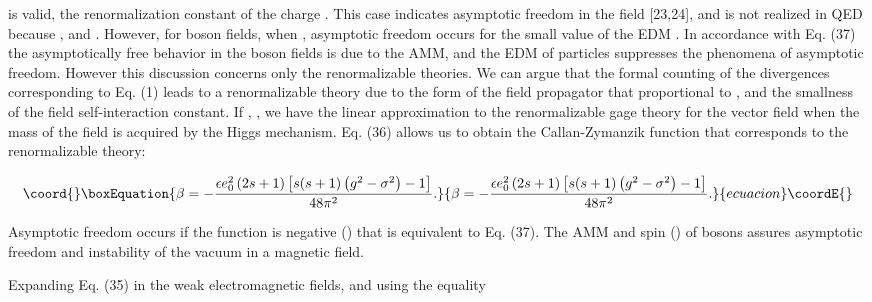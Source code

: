 \documentclass[a4paper,12pt]{article}
\begin{document}
is valid, the renormalization constant of the charge \coordHE{}. This
case indicates asymptotic freedom in the field [23,24], and is not realized
in QED because \coordHE{}, \coordHE{} and \coordHE{}. However, for boson
fields, when \coordHE{}, asymptotic freedom occurs for the small value of
the EDM \myHighlight{$\sigma $}\coordHE{}. In accordance with Eq. (37) the asymptotically free
behavior in the boson fields is due to the AMM, and the EDM of particles
suppresses the phenomena of asymptotic freedom. However this discussion
concerns only the renormalizable theories. We can argue that the formal
counting of the divergences corresponding to Eq. (1) leads to a
renormalizable theory due to the form of the field propagator that
proportional to \coordHE{}, and the smallness of the field self-interaction
constant. If \coordHE{}, \coordHE{}, we have the linear approximation to the
renormalizable gage theory for the vector field when the mass of the field
is acquired by the Higgs mechanism. Eq. (36) allows us to obtain the
Callan-Zymanzik \myHighlight{$\beta $}\coordHE{} function that corresponds to the renormalizable
theory:

\begin{equation}\coord{}\boxEquation{
\beta =-\frac{\epsilon e_0^2\left( 2s+1\right) \left[ s(s+1)\left(
g^2-\sigma ^2\right) -1\right] }{48\pi ^2}.  \label{38}
}{
\beta =-\frac{\epsilon e_0^2\left( 2s+1\right) \left[ s(s+1)\left(
g^2-\sigma ^2\right) -1\right] }{48\pi ^2}.  }{ecuacion}\coordE{}\end{equation}

Asymptotic freedom occurs if the \myHighlight{$\beta $}\coordHE{} function is negative (\coordHE{})
that is equivalent to Eq. (37). The AMM and spin (\coordHE{}) of bosons assures
asymptotic freedom and instability of the vacuum in a magnetic field.

Expanding Eq. (35) in the weak electromagnetic fields, and using the equality
\end{document}
